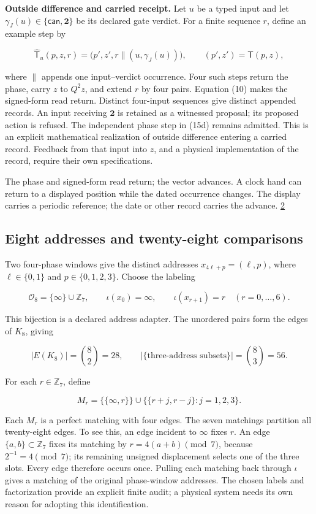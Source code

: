 \textbf{Outside difference and carried receipt.} Let \(u\) be a typed input and let \(\gamma_J(u)\in\{\mathsf{can},\mathbf2\}\) be its declared gate verdict. For a finite sequence \(r\), define an example step by

\[
\widehat{\mathsf T}_u(p,z,r)
=\bigl(p',z',r\mathbin{\|}(u,\gamma_J(u))\bigr),
\qquad(p',z')=\mathsf T(p,z),
\tag{15d}
\]

where \(\|\) appends one input--verdict occurrence. Four such steps return the phase, carry \(z\) to \(Q^2z\), and extend \(r\) by four pairs. Equation (10) makes the signed-form read return. Distinct four-input sequences give distinct appended records. An input receiving \(\mathbf2\) is retained as a witnessed proposal; its proposed action is refused. The independent phase step in (15d) remains admitted. This is an explicit mathematical realization of outside difference entering a carried record. Feedback from that input into \(z\), and a physical implementation of the record, require their own specifications.

The phase and signed-form read return; the vector advances. A clock hand can return to a displayed position while the dated occurrence changes. The display carries a periodic reference; the date or other record carries the advance. \href{https://doi.org/10.5281/zenodo.23697265}{2}

\hypertarget{eight-addresses-and-twenty-eight-comparisons}{%
\subsection{Eight addresses and twenty-eight comparisons}\label{eight-addresses-and-twenty-eight-comparisons}}

Two four-phase windows give the distinct addresses \(x_{4\ell+p}=(\ell,p)\), where \(\ell\in\{0,1\}\) and \(p\in\{0,1,2,3\}\). Choose the labeling

\[
\mathcal O_8=\{\infty\}\cup\mathbb Z_7,\qquad
\iota(x_0)=\infty,\qquad
\iota(x_{r+1})=r\quad(r=0,\ldots,6).
\tag{16}
\]

This bijection is a declared address adapter. The unordered pairs form the edges of \(K_8\), giving

\[
|E(K_8)|=\binom82=28,
\qquad
|\{\text{three-address subsets}\}|=\binom83=56.
\tag{17}
\]

For each \(r\in\mathbb Z_7\), define

\[
M_r=\{\{\infty,r\}\}
\cup
\bigl\{\{r+j,r-j\}:j=1,2,3\bigr\}.
\tag{18}
\]

Each \(M_r\) is a perfect matching with four edges. The seven matchings partition all twenty-eight edges. To see this, an edge incident to \(\infty\) fixes \(r\). An edge \(\{a,b\}\subset\mathbb Z_7\) fixes its matching by \(r=4(a+b)\pmod7\), because \(2^{-1}=4\pmod7\); its remaining unsigned displacement selects one of the three slots. Every edge therefore occurs once. Pulling each matching back through \(\iota\) gives a matching of the original phase-window addresses. The chosen labels and factorization provide an explicit finite audit; a physical system needs its own reason for adopting this identification.


